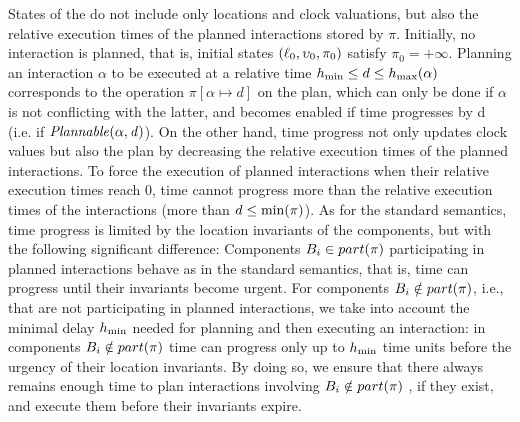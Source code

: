 States of the \lpsabrb do not include only locations and clock valuations, 
but also the relative execution times of the planned interactions stored by $\pi$.
Initially, no interaction is planned, that is, initial states $(\ell_0,\upsilon_0,\pi_0)$ 
satisfy $\pi_0 = +\infty$.
Planning an interaction $\alpha$ to be executed at a relative time $h_{\min}\le d\le h_{\max}
(\alpha)$ corresponds to the operation $\pi [ \alpha\mapsto d  ]$ on the plan, 
which can only be done if $\alpha$ is not conflicting with the latter, and becomes enabled if 
time progresses by d (i.e. if $\mathit{Plannable(\alpha,d)}$).
On the other hand, time progress not only updates clock values but also the plan by 
decreasing the relative execution times of the planned interactions.
To force the execution of planned interactions when their relative execution times reach $0$, 
time cannot progress more than the relative execution times of the interactions 
(more than $d \le \min(\pi)$).
As for the standard semantics, time progress is limited by the location invariants 
of the components, but with the following significant difference:
Components $B_i \in part(\pi)$ participating in planned interactions behave as in the standard 
semantics, that is, time can progress until their invariants become urgent.
For components $B_i \notin part(\pi)$, i.e., that are not participating in planned interactions, 
we take into account the minimal delay $h_{\min}$ needed for planning and then executing an 
interaction: in components $B_i \notin part(\pi)$ time can progress only up to $h_{\min}$ time 
units before the urgency of their location invariants.
By doing so, we ensure that there always remains enough time to plan interactions involving 
$B_i \notin part(\pi)$ , if they exist, and execute them before their invariants 
expire.
 
